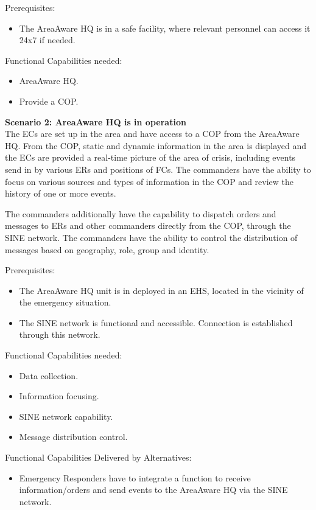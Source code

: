 \noindent Prerequisites:
\begin{itemize}
	\item The AreaAware HQ is in a safe facility, where relevant personnel can access it 24x7 if needed.
\end{itemize}

\noindent Functional Capabilities needed:
\begin{itemize}
	\itemsep0em
	\item AreaAware HQ.
	\item Provide a COP.
\end{itemize}

\vspace{20pt}
\noindent \textbf{Scenario 2: AreaAware HQ is in operation} \\
The ECs are set up in the area and have access to a COP from the AreaAware HQ.
From the COP, static and dynamic information in the area is displayed and the ECs are provided a real-time picture of the area of crisis, including events send in by various ERs and positions of FCs.
The commanders have the ability to focus on various sources and types of information in the COP and review the history of one or more events. 

The commanders additionally have the capability to dispatch orders and messages to ERs and other commanders directly from the COP, through the SINE network. The commanders have the ability to control the distribution of messages based on geography, role, group and identity.

\noindent Prerequisites:
\begin{itemize}
	\itemsep0em
	\item The AreaAware HQ unit is in deployed in an EHS, located in the vicinity of the emergency situation.
	\item The SINE network is functional and accessible. Connection is established through this network.
\end{itemize}

\newpage
\noindent Functional Capabilities needed:
\begin{itemize}
	\itemsep0em
	\item Data collection.
	\item Information focusing.
	\item SINE network capability.
	\item Message distribution control.
\end{itemize}

\noindent Functional Capabilities Delivered by Alternatives:
\begin{itemize}
	\item Emergency Responders have to integrate a function to receive information/orders and send events to the AreaAware HQ via the SINE network.
\end{itemize} 

